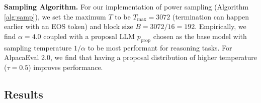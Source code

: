 \documentclass{article}
\renewcommand{\paragraph}[1]{\vspace{.1em}\noindent\textbf{#1}}
\begin{document}
\paragraph{Sampling Algorithm.} For our implementation of power sampling (Algorithm \ref{alg:samp}), we set the maximum $T$ to be $T_{\text{max}} = 3072$ (termination can happen earlier with an EOS token) and block size $B = 3072/16 = 192$. Empirically, we find $\alpha = 4.0$ coupled with a proposal LLM $p_{\text{prop}}$ chosen as the base model with sampling temperature $1/\alpha$ to be  most performant for reasoning tasks. For AlpacaEval 2.0, we find that having a proposal distribution of higher temperature ($\tau = 0.5$) improves performance. 

\subsection{Results}
\end{document}
